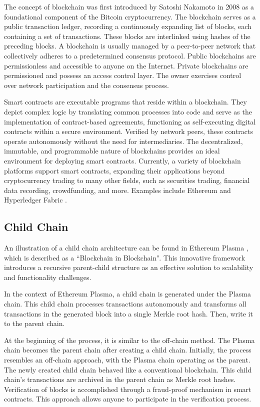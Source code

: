 \documentclass[10pt,journal]{IEEEtran}
\begin{document}
The concept of blockchain was first introduced by Satoshi Nakamoto in 2008 \cite{nakamoto2008bitcoin} as a foundational component of the Bitcoin cryptocurrency. The blockchain serves as a public transaction ledger, recording a continuously expanding list of blocks, each containing a set of transactions. These blocks are interlinked using hashes of the preceding blocks. A blockchain is usually managed by a peer-to-peer network that collectively adheres to a predetermined consensus protocol. Public blockchains are permissionless and accessible to anyone on the Internet. Private blockchains are permissioned and possess an access control layer. The owner exercises control over network participation and the consensus process.


Smart contracts are executable programs that reside within a blockchain. They depict complex logic by translating common processes into code and serve as the implementation of contract-based agreements, functioning as self-executing digital contracts within a secure environment. Verified by network peers, these contracts operate autonomously without the need for intermediaries. The decentralized, immutable, and programmable nature of blockchains provides an ideal environment for deploying smart contracts. Currently, a variety of blockchain platforms support smart contracts, expanding their applications beyond cryptocurrency trading to many other fields, such as securities trading, financial data recording, crowdfunding, and more. Examples include Ethereum \cite{buterin2014next} and Hyperledger Fabric \cite{androulaki2018hyperledger}.


\subsection{Child Chain}

An illustration of a child chain architecture can be found in Ethereum Plasma \cite{poon2017plasma}, which is described as a ``Blockchain in Blockchain". This innovative framework introduces a recursive parent-child structure as an effective solution to scalability and functionality challenges.

In the context of Ethereum Plasma, a child chain is generated under the Plasma chain.
This child chain processes transactions autonomously and transforms all transactions in the generated block into a single Merkle root hash. Then, write it to the parent chain.

At the beginning of the process, it is similar to the off-chain method. The Plasma chain becomes the parent chain after creating a child chain. Initially, the process resembles an off-chain approach, with the Plasma chain operating as the parent. The newly created child chain behaved like a conventional blockchain. This child chain's transactions are archived in the parent chain as Merkle root hashes. Verification of blocks is accomplished through a fraud-proof mechanism in smart contracts. This approach allows anyone to participate in the verification process.
\end{document}
